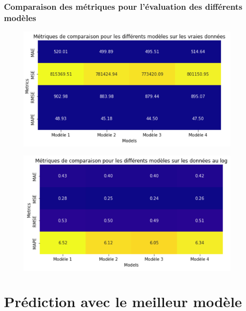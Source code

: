 \documentclass{beamer}
\theoremstyle{definition}
\begin{document}
\begin{frame}
	\frametitle{Comparaison des métriques pour l'évaluation des différents modèles}
	\begin{minipage}[t]{1\linewidth}
		\centering
		\begin{minipage}[c]{0.49\linewidth}\centering\begin{figure}
				\centering
				\includegraphics[width=1\linewidth]{32.png}	
		\end{figure}\end{minipage}\hfill 
		\begin{minipage}[c]{0.49\linewidth}\centering\begin{figure}
				\begin{center}
					\includegraphics[width=1\linewidth]{33.png}			
				\end{center}
				
		\end{figure}\end{minipage}
	\end{minipage}	
\end{frame}

\section{Prédiction avec le meilleur modèle}
\end{document}
